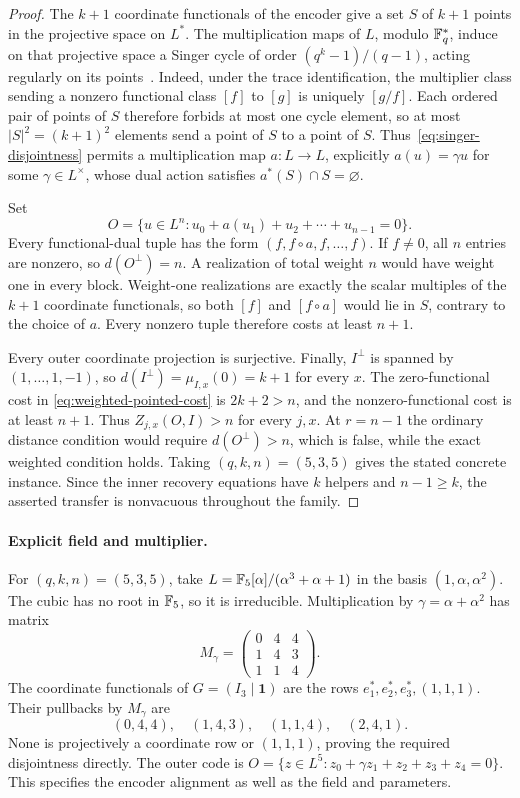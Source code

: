 \begin{proof}
The $k+1$ coordinate functionals of the encoder give a set $S$ of $k+1$
points in the projective space on $L^*$.  The multiplication maps of $L$,
modulo $\mathbb F_q^*$, induce on that projective space a Singer cycle of order
$(q^k-1)/(q-1)$, acting regularly on its points~\cite{Singer1938}.
Indeed, under the trace identification, the multiplier class sending a
nonzero functional class $[f]$ to $[g]$ is uniquely $[g/f]$.
Each ordered pair of points of $S$ therefore forbids at most one cycle
element, so at most $|S|^2=(k+1)^2$ elements send a point of $S$ to a point
of $S$.  Thus~\eqref{eq:singer-disjointness} permits a multiplication map
$a:L\to L$, explicitly $a(u)=\gamma u$ for some $\gamma\in L^\times$, whose
dual action satisfies
$a^*(S)\cap S=\varnothing$.

Set
\[
 O=\{u\in L^n:u_0+a(u_1)+u_2+\cdots+u_{n-1}=0\}.
\]
Every functional-dual tuple has the form
$(f,f\circ a,f,\ldots,f)$.  If $f\neq0$, all $n$ entries are nonzero, so
$d(O^\perp)=n$.  A realization of total weight $n$ would have weight one in
every block.  Weight-one realizations are exactly the scalar multiples of
the $k+1$ coordinate functionals, so both $[f]$ and $[f\circ a]$ would lie
in $S$, contrary to the choice of $a$.  Every nonzero tuple therefore costs
at least $n+1$.

Every outer coordinate projection is surjective.  Finally, $I^\perp$ is
spanned by $(1,\ldots,1,-1)$, so
$d(I^\perp)=\mu_{I,x}(0)=k+1$ for every $x$.  The zero-functional cost in
\eqref{eq:weighted-pointed-cost} is $2k+2>n$, and the nonzero-functional cost
is at least $n+1$.  Thus $Z_{j,x}(O,I)>n$ for every $j,x$.  At $r=n-1$ the
ordinary distance condition would require $d(O^\perp)>n$, which is false, while the exact
weighted condition holds.  Taking $(q,k,n)=(5,3,5)$ gives the stated concrete
instance.  Since the inner recovery equations have $k$ helpers and
$n-1\geq k$, the asserted transfer is nonvacuous throughout the family.
%
%
\end{proof}

\paragraph{Explicit field and multiplier.}
For $(q,k,n)=(5,3,5)$, take
$L=\mathbb F_5[\alpha]/(\alpha^3+\alpha+1)$ in the basis $(1,\alpha,\alpha^2)$.
The cubic has no root in $\mathbb F_5$, so it is irreducible.
Multiplication by $\gamma=\alpha+\alpha^2$ has matrix
\[
 M_\gamma=\begin{pmatrix}0&4&4\\1&4&3\\1&1&4\end{pmatrix}.
\]
The coordinate functionals of $G=(I_3\mid\mathbf1)$ are the rows
$e_1^*,e_2^*,e_3^*,(1,1,1)$.  Their pullbacks by $M_\gamma$ are
\[
 (0,4,4),\quad(1,4,3),\quad(1,1,4),\quad(2,4,1).
\]
None is projectively a coordinate row or $(1,1,1)$, proving the required
disjointness directly.  The outer code is
$O=\{z\in L^5:z_0+\gamma z_1+z_2+z_3+z_4=0\}$.
This specifies the encoder alignment as well as the field and parameters.


